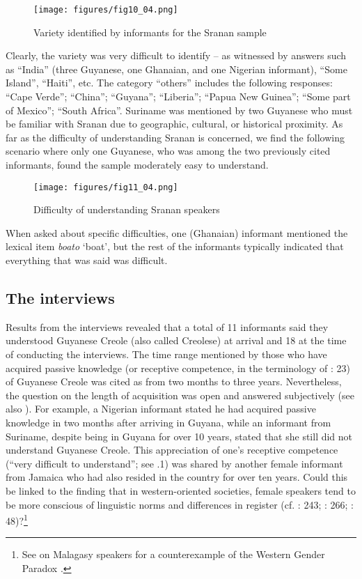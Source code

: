 \documentclass[output=paper,colorlinks,citecolor=brown]{langscibook}
\begin{document}
\begin{figure}[t]
    \texttt{[image: figures/fig10\_04.png]}
    \caption{Variety identified by informants for the Sranan sample}
    \label{fig:fig10_04}
\end{figure}

Clearly, the variety was very difficult to identify – as witnessed by answers such as “India” (three Guyanese, one Ghanaian, and one Nigerian informant), “Some Island”, “Haiti”, etc. The category “others” includes the following responses: “Cape Verde''; ``China''; ``Guyana''; ``Liberia''; ``Papua New Guinea''; ``Some part of Mexico''; ``South Africa”. Suriname was mentioned by two Guyanese who must be familiar with Sranan due to geographic, cultural, or historical proximity. As far as the difficulty of understanding Sranan is concerned, we find the following scenario where only one Guyanese, who was among the two previously cited informants, found the sample moderately easy to understand.

\begin{figure}[t]
    \texttt{[image: figures/fig11\_04.png]}
    \caption{Difficulty of understanding Sranan speakers}
    \label{fig:fig11_04}
\end{figure}

When asked about specific difficulties, one (Ghanaian) informant mentioned the lexical item \emph{boato} ‘boat’, but the rest of the informants typically indicated that everything that was said was difficult. 

\subsection{The interviews}\label{sec:04:3.2}

Results from the interviews revealed that a total of 11 informants said they understood Guyanese Creole (also called Creolese) at arrival and 18 at the time of conducting the interviews. The time range mentioned by those who have acquired passive knowledge (or receptive competence, in the terminology of \cite{Romaine_1994}: 23) of Guyanese Creole was cited as from two months to three years. Nevertheless, the question on the length of acquisition was open and answered subjectively (see also ). For example, a Nigerian informant stated he had acquired passive knowledge in two months after arriving in Guyana, while an informant from Suriname, despite being in Guyana for over 10 years, stated that she still did not understand Guyanese Creole. This appreciation of one’s receptive competence (“very difficult to understand”; see .1) was shared by another female informant from Jamaica who had also resided in the country for over ten years. Could this be linked to the finding that in western-oriented societies, female speakers tend to be more conscious of linguistic norms and differences in register (cf. \cite{Labov_1972}: 243; \citeyear{Labov_2001}: 266; \cite{Lakoff_1973}: 48)?\footnote{See \citet{Keenan_1989} on Malagasy speakers for a counterexample of the Western Gender Paradox \citep[292--293]{Labov_2001}.}
\end{document}
